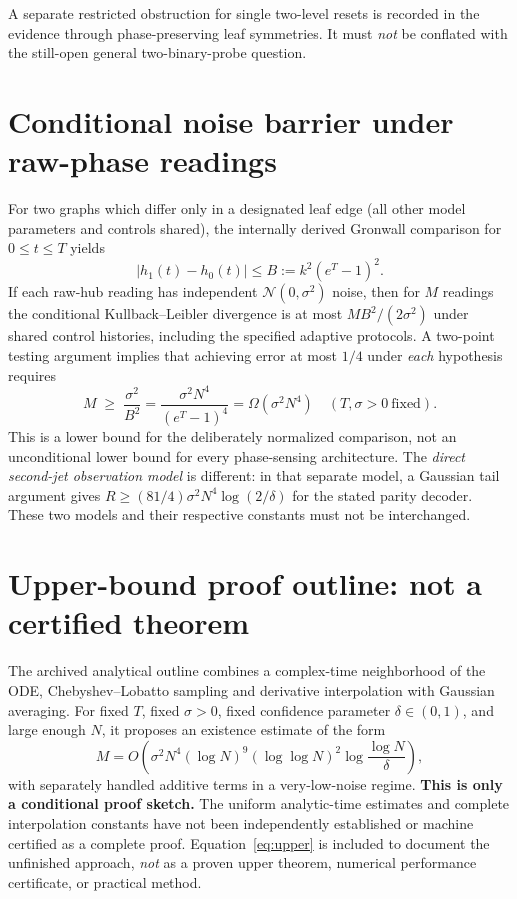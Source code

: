 \documentclass[11pt,a4paper]{article}
\begin{document}
A separate restricted obstruction for single two-level resets is recorded in the evidence through phase-preserving leaf symmetries. It must \emph{not} be conflated with the still-open general two-binary-probe question.
\section{Conditional noise barrier under raw-phase readings}
For two graphs which differ only in a designated leaf edge (all other model parameters and controls shared), the internally derived Gronwall comparison for $0\le t\le T$ yields
\begin{equation}
|h_1(t)-h_0(t)|\le B := k^2(e^T-1)^2.
\label{eq:bound}
\end{equation}
If each raw-hub reading has independent $\mathcal{N}(0,\sigma^2)$ noise, then for $M$ readings the conditional Kullback--Leibler divergence is at most $MB^2/(2\sigma^2)$ under shared control histories, including the specified adaptive protocols. A two-point testing argument implies that achieving error at most $1/4$ under \emph{each} hypothesis requires
\begin{equation}
M\;\ge\;\frac{\sigma^2}{B^2}
=\frac{\sigma^2 N^4}{(e^T-1)^4}
=\Omega(\sigma^2 N^4)\quad(T,\sigma>0\ \mathrm{fixed}).
\label{eq:lower}
\end{equation}
This is a lower bound for the deliberately normalized comparison, not an unconditional lower bound for every phase-sensing architecture. The \emph{direct second-jet observation model} is different: in that separate model, a Gaussian tail argument gives $R\ge(81/4)\sigma^2N^4\log(2/\delta)$ for the stated parity decoder. These two models and their respective constants must not be interchanged.
\section{Upper-bound proof outline: \textbf{not a certified theorem}}
The archived analytical outline combines a complex-time neighborhood of the ODE, Chebyshev--Lobatto sampling and derivative interpolation with Gaussian averaging. For fixed $T$, fixed $\sigma>0$, fixed confidence parameter $\delta\in(0,1)$, and large enough $N$, it proposes an existence estimate of the form
\begin{equation}
 M=O\!\left(\sigma^2 N^4(\log N)^9(\log\log N)^2\log\!\frac{\log N}{\delta}\right),
\label{eq:upper}
\end{equation}
with separately handled additive terms in a very-low-noise regime. \textbf{This is only a conditional proof sketch.} The uniform analytic-time estimates and complete interpolation constants have not been independently established or machine certified as a complete proof. Equation~\eqref{eq:upper} is included to document the unfinished approach, \emph{not} as a proven upper theorem, numerical performance certificate, or practical method.
\end{document}
